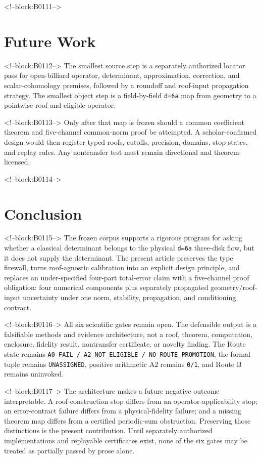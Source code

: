 \documentclass[11pt,a4paper]{article}
\begin{document}
<!--block:B0111-->
\section{Future Work}

<!--block:B0112-->
The smallest source step is a separately authorized locator pass for open-billiard operator, determinant, approximation, correction, and scalar-cohomology premises, followed by a roundoff and roof-input propagation strategy. The smallest object step is a field-by-field \texttt{d=6a} map from geometry to a pointwise roof and eligible operator.

<!--block:B0113-->
Only after that map is frozen should a common coefficient theorem and five-channel common-norm proof be attempted. A scholar-confirmed design would then register typed roofs, cutoffs, precision, domains, stop states, and replay rules. Any nontransfer test must remain directional and theorem-licensed.

<!--block:B0114-->
\section{Conclusion}

<!--block:B0115-->
The frozen corpus supports a rigorous program for asking whether a classical determinant belongs to the physical \texttt{d=6a} three-disk flow, but it does not supply the determinant. The present article preserves the type firewall, turns roof-agnostic calibration into an explicit design principle, and replaces an under-specified four-part total-error claim with a five-channel proof obligation: four numerical components plus separately propagated geometry/roof-input uncertainty under one norm, stability, propagation, and conditioning contract.

<!--block:B0116-->
All six scientific gates remain open. The defensible output is a falsifiable methods and evidence architecture, not a roof, theorem, computation, enclosure, fidelity result, nontransfer certificate, or novelty finding. The Route state remains \texttt{A0\_FAIL\ /\ A2\_NOT\_ELIGIBLE\ /\ NO\_ROUTE\_PROMOTION}, the formal tuple remains \texttt{UNASSIGNED}, positive arithmetic A2 remains \texttt{0/1}, and Route B remains uninvoked.

<!--block:B0117-->
The architecture makes a future negative outcome interpretable. A roof-construction stop differs from an operator-applicability stop; an error-contract failure differs from a physical-fidelity failure; and a missing theorem map differs from a certified periodic-sum obstruction. Preserving those distinctions is the present contribution. Until separately authorized implementations and replayable certificates exist, none of the six gates may be treated as partially passed by prose alone.
\end{document}
